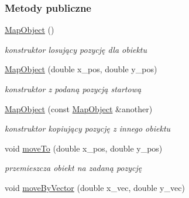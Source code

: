 \subsubsection*{Metody publiczne}
\begin{DoxyCompactItemize}
\item 
\hypertarget{classMapObject_a568754515cc72ce0861d30c3040d26d2}{\hyperlink{classMapObject_a568754515cc72ce0861d30c3040d26d2}{Map\-Object} ()}\label{classMapObject_a568754515cc72ce0861d30c3040d26d2}

\begin{DoxyCompactList}\small\item\em konstruktor losujący pozycję dla obiektu \end{DoxyCompactList}\item 
\hypertarget{classMapObject_a2b742185ede789e5cb5beabb18e24eb2}{\hyperlink{classMapObject_a2b742185ede789e5cb5beabb18e24eb2}{Map\-Object} (double x\-\_\-pos, double y\-\_\-pos)}\label{classMapObject_a2b742185ede789e5cb5beabb18e24eb2}

\begin{DoxyCompactList}\small\item\em konstruktor z podaną pozycją startową \end{DoxyCompactList}\item 
\hypertarget{classMapObject_adbba6351e2a4a25fdd40d7c00ca37222}{\hyperlink{classMapObject_adbba6351e2a4a25fdd40d7c00ca37222}{Map\-Object} (const \hyperlink{classMapObject}{Map\-Object} \&another)}\label{classMapObject_adbba6351e2a4a25fdd40d7c00ca37222}

\begin{DoxyCompactList}\small\item\em konstruktor kopiujący pozycję z innego obiektu \end{DoxyCompactList}\item 
\hypertarget{classMapObject_a49b4b675ef2895fc05ef2eec72f4cd46}{void \hyperlink{classMapObject_a49b4b675ef2895fc05ef2eec72f4cd46}{move\-To} (double x\-\_\-pos, double y\-\_\-pos)}\label{classMapObject_a49b4b675ef2895fc05ef2eec72f4cd46}

\begin{DoxyCompactList}\small\item\em przemieszcza obiekt na zadaną pozycję \end{DoxyCompactList}\item 
\hypertarget{classMapObject_a9c111830e35093dd3b2f668c6d7d9736}{void \hyperlink{classMapObject_a9c111830e35093dd3b2f668c6d7d9736}{move\-By\-Vector} (double x\-\_\-vec, double y\-\_\-vec)}\label{classMapObject_a9c111830e35093dd3b2f668c6d7d9736}


\end{DoxyCompactItemize}

